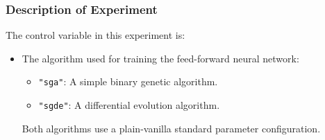 \begin{frame}
\frametitle{
Description of Experiment
}
The control variable in this experiment is:
\begin{itemize}
\item The algorithm used for training the feed-forward neural network:
\begin{itemize} 
\item {\tt "sga"}: A simple binary genetic algorithm.
\item {\tt "sgde"}: A differential evolution algorithm.
\end{itemize}
Both algorithms use a plain-vanilla standard parameter configuration.
\end{itemize}
\end{frame}